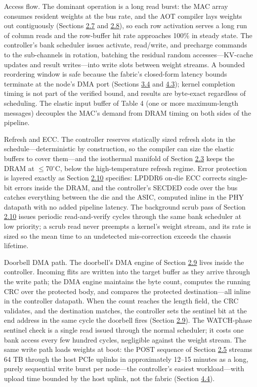 \documentclass[12pt,onecolumn]{article}
\begin{document}
Access flow. The dominant operation is a long read burst: the MAC array consumes resident weights at the bus rate, and the AOT compiler lays weights out contiguously (Sections \hyperref[sec:2.7]{2.7} and \hyperref[sec:2.8]{2.8}), so each row activation serves a long run of column reads and the row-buffer hit rate approaches 100\% in steady state. The controller's bank scheduler issues activate, read/write, and precharge commands to the sub-channels in rotation, batching the residual random accesses---KV-cache updates and result writes---into write slots between weight streams. A bounded reordering window is safe because the fabric's closed-form latency bounds terminate at the node's DMA port (Sections \hyperref[sec:3.4]{3.4} and \hyperref[sec:4.3]{4.3}); kernel completion timing is not part of the verified bound, and results are byte-exact regardless of scheduling. The elastic input buffer of Table 4 (one or more maximum-length messages) decouples the MAC's demand from DRAM timing on both sides of the pipeline.

Refresh and ECC. The controller reserves statically sized refresh slots in the schedule---deterministic by construction, so the compiler can size the elastic buffers to cover them---and the isothermal manifold of Section \hyperref[sec:2.3]{2.3} keeps the DRAM at $\leq$70$^\circ$C, below the high-temperature refresh regime. Error protection is layered exactly as Section \hyperref[sec:2.10]{2.10} specifies: LPDDR6 on-die ECC corrects single-bit errors inside the DRAM, and the controller's SECDED code over the bus catches everything between the die and the ASIC, computed inline in the PHY datapath with no added pipeline latency. The background scrub pass of Section \hyperref[sec:2.10]{2.10} issues periodic read-and-verify cycles through the same bank scheduler at low priority; a scrub read never preempts a kernel's weight stream, and its rate is sized so the mean time to an undetected mis-correction exceeds the chassis lifetime.

Doorbell DMA path. The doorbell's DMA engine of Section \hyperref[sec:2.9]{2.9} lives inside the controller. Incoming flits are written into the target buffer as they arrive through the write path; the DMA engine maintains the byte count, computes the running CRC over the protected body, and compares the protected destination---all inline in the controller datapath. When the count reaches the length field, the CRC validates, and the destination matches, the controller sets the sentinel bit at the end address in the same cycle the doorbell fires (Section \hyperref[sec:2.9]{2.9}). The WATCH-phase sentinel check is a single read issued through the normal scheduler; it costs one bank access every few hundred cycles, negligible against the weight stream. The same write path loads weights at boot: the POST sequence of Section \hyperref[sec:2.5]{2.5} streams 64 TB through the host PCIe uplinks in approximately 12--15 minutes as a long, purely sequential write burst per node---the controller's easiest workload---with upload time bounded by the host uplink, not the fabric (Section \hyperref[sec:4.4]{4.4}).
\end{document}
